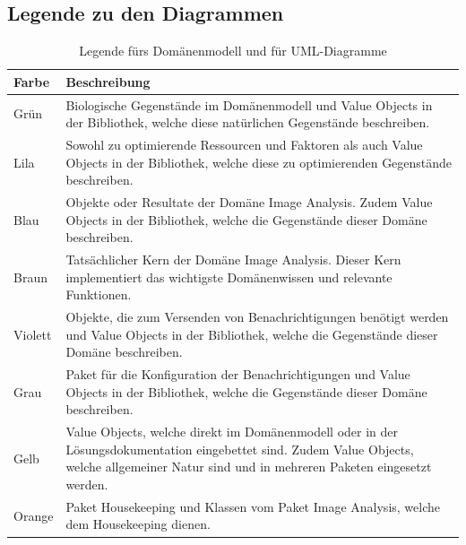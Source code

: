 \subsection{Legende zu den Diagrammen}
\begin{table}[H]
	\centering	
	
	\begin{tabular}{ p{2cm}  p{12cm}  }
		
		\toprule[1pt]
		\rowcolor{maroon!30}	
		Farbe & Beschreibung \\
		
		\midrule
Grün \cellcolor[RGB]{204,235,197}&  Biologische Gegenstände im Domänenmodell und Value Objects in der Bibliothek, welche diese natürlichen Gegenstände beschreiben. \\
Lila \cellcolor[RGB]{253,218,236} & Sowohl zu optimierende Ressourcen und Faktoren als auch Value Objects in der Bibliothek,  welche diese zu optimierenden Gegenstände beschreiben.\\
Blau\cellcolor[RGB]{179,205,227} &  Objekte oder Resultate der Domäne \glqq{}Image Analysis\grqq{}. Zudem Value Objects in der Bibliothek, welche die Gegenstände dieser Domäne beschreiben. \\
Braun \cellcolor[RGB]{229,216,189}& Tatsächlicher Kern der Domäne \glqq{}Image Analysis\grqq{}. Dieser Kern implementiert das wichtigste Domänenwissen und relevante Funktionen.\\			
Violett \cellcolor[RGB]{222,203,228} & Objekte, die zum Versenden von Benachrichtigungen benötigt werden und Value Objects in der Bibliothek, welche die Gegenstände dieser Domäne beschreiben.\\
Grau\cellcolor[RGB]{242,242,242} &  Paket für die Konfiguration der Benachrichtigungen und Value Objects in der Bibliothek, welche die Gegenstände dieser Domäne beschreiben.\\		
Gelb \cellcolor[RGB]{255,255,204}& Value Objects, welche direkt im Domänenmodell oder in der Lösungsdokumentation eingebettet sind. Zudem Value Objects, welche allgemeiner Natur sind und in mehreren Paketen eingesetzt werden. \\		
Orange \cellcolor[RGB]{254,217,166} &  Paket \glqq{}Housekeeping\grqq{} und Klassen vom Paket \glqq{}Image Analysis\grqq{}, welche dem Housekeeping dienen. \\
		
		\bottomrule
		
	\end{tabular}
	\caption{Legende fürs Domänenmodell und für UML-Diagramme}
	\label{tab: Legende fürs Domänenmodell und für die UML-Diagramme als Lösungsdokumentation}
\end{table}

